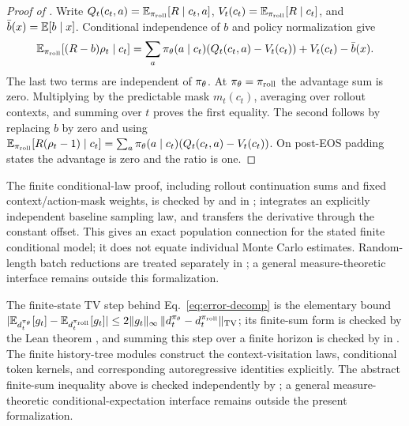 \begin{proof}[Proof of ]
Write $Q_t(c_t,a)=\mathbb{E}_{\pi_{\mathrm{roll}}}[R\mid c_t,a]$, $V_t(c_t)=\mathbb{E}_{\pi_{\mathrm{roll}}}[R\mid c_t]$, and
$\bar b(x)=\mathbb{E}[b\mid x]$. Conditional independence of $b$ and policy normalization give
\begin{equation*}
    \mathbb{E}_{\pi_{\mathrm{roll}}}[(R-b)\rho_t\mid c_t]
    =\sum_a\pi_{\theta}(a\mid c_t)(Q_t(c_t,a)-V_t(c_t))
      +V_t(c_t)-\bar b(x).
\end{equation*}
The last two terms are independent of $\pi_{\theta}$. At $\pi_{\theta}=\pi_{\mathrm{roll}}$ the advantage sum is zero.
Multiplying by the predictable mask $m_t(c_t)$, averaging over rollout contexts, and summing over $t$ proves the first equality.
The second follows by replacing $b$ by zero and using
$\mathbb{E}_{\pi_{\mathrm{roll}}}[R(\rho_t-1)\mid c_t]=\sum_a\pi_{\theta}(a\mid c_t)(Q_t(c_t,a)-V_t(c_t))$.
On post-EOS padding states the advantage is zero and the ratio is one.
\end{proof}

The finite conditional-law proof, including rollout continuation sums and fixed context/action-mask weights, is checked by
 and  in
;  integrates an explicitly independent baseline
sampling law, and  transfers the derivative through the constant offset.
This gives an exact population connection for the stated finite conditional model;
it does not equate individual Monte Carlo estimates. Random-length batch reductions
are treated separately in ;
a general measure-theoretic interface remains outside this formalization.

The finite-state TV step behind Eq.~\eqref{eq:error-decomp} is the elementary bound
$|\mathbb{E}_{d_t^{\pi_{\theta}}}[g_t]-\mathbb{E}_{d_t^{\pi_{\mathrm{roll}}}}[g_t]|\le
2\|g_t\|_\infty\,\|d_t^{\pi_{\theta}}-d_t^{\pi_{\mathrm{roll}}}\|_{\mathrm{TV}}$; its finite-sum form is
checked by the Lean theorem , and summing this
step over a finite horizon is checked by
 in .
The finite history-tree modules construct the context-visitation laws,
conditional token kernels, and corresponding autoregressive identities
explicitly. The abstract finite-sum inequality above is checked independently
by ; a general measure-theoretic
conditional-expectation interface remains outside the present formalization.

